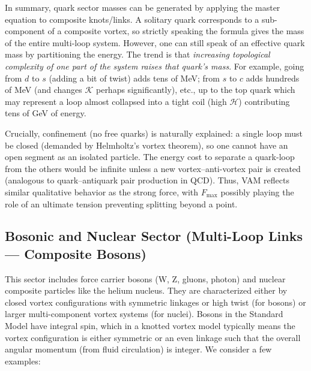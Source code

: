     In summary, quark sector masses can be generated by applying the master equation to composite knots/links. A solitary quark corresponds to a sub-component of a composite vortex, so strictly speaking the formula gives the mass of the entire multi-loop system. However, one can still speak of an effective quark mass by partitioning the energy. The trend is that \textit{increasing topological complexity of one part of the system raises that quark’s mass}. For example, going from $d$ to $s$ (adding a bit of twist) adds tens of MeV; from $s$ to $c$ adds hundreds of MeV (and changes $\mathcal{K}$ perhaps significantly), etc., up to the top quark which may represent a loop almost collapsed into a tight coil (high $\mathcal{H}$) contributing tens of GeV of energy.

    Crucially, confinement (no free quarks) is naturally explained: a single loop must be closed (demanded by Helmholtz’s vortex theorem), so one cannot have an open segment as an isolated particle. The energy cost to separate a quark-loop from the others would be infinite unless a new vortex–anti-vortex pair is created (analogous to quark–antiquark pair production in QCD). Thus, VAM reflects similar qualitative behavior as the strong force, with $F_{\max}$ possibly playing the role of an ultimate tension preventing splitting beyond a point.

    \subsection{Bosonic and Nuclear Sector (Multi-Loop Links — Composite Bosons)}

    This sector includes force carrier bosons (W, Z, gluons, photon) and nuclear composite particles like the helium nucleus. They are characterized either by closed vortex configurations with symmetric linkages or high twist (for bosons) or larger multi-component vortex systems (for nuclei). Bosons in the Standard Model have integral spin, which in a knotted vortex model typically means the vortex configuration is either symmetric or an even linkage such that the overall angular momentum (from fluid circulation) is integer. We consider a few examples:

